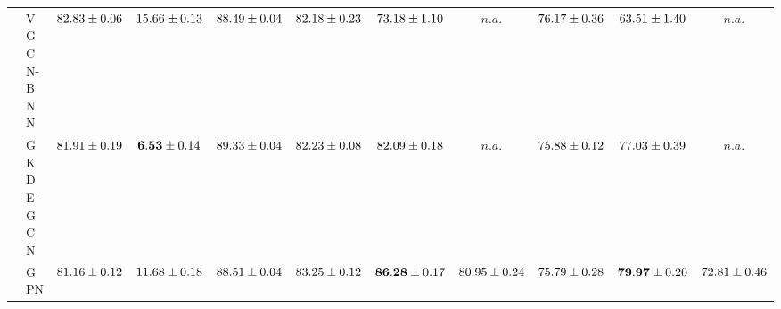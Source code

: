 \begin{table*}[!h]
{\begin{tabular}{ll|cc|cccc|ccc}
        & VGCN-BNN & ${82.83\tiny \pm 0.06}$ & ${15.66\tiny \pm 0.13}$ & ${88.49\tiny \pm 0.04}$ & ${82.18\tiny \pm 0.23}$ & ${73.18\tiny \pm 1.10}$ & $n.a.$ & ${76.17\tiny \pm 0.36}$ & ${63.51\tiny \pm 1.40}$ & $n.a.$\\
        & GKDE-GCN & ${81.91\tiny \pm 0.19}$ & ${\mathbf{6.53}\tiny \pm 0.14}$ & ${89.33\tiny \pm 0.04}$ & ${82.23\tiny \pm 0.08}$ & ${82.09\tiny \pm 0.18}$ & $n.a.$ & ${75.88\tiny \pm 0.12}$ & ${77.03\tiny \pm 0.39}$ & $n.a.$\\
        & GPN & ${81.16\tiny \pm 0.12}$ & ${11.68\tiny \pm 0.18}$ & ${88.51\tiny \pm 0.04}$ & ${83.25\tiny \pm 0.12}$ & ${\mathbf{86.28}\tiny \pm 0.17}$ & ${{80.95}\tiny \pm 0.24}$ & ${75.79\tiny \pm 0.28}$ & ${\mathbf{79.97}\tiny \pm 0.20}$ & ${{72.81}\tiny \pm 0.46}$\\

        \midrule
        

\end{tabular}}
\end{table*}
